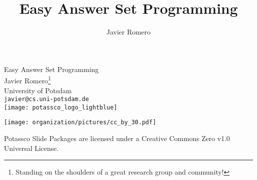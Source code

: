 \title{Easy Answer Set Programming}
\author{Javier Romero}
\begin{frame}[c]
  \bigskip
  \vfill
  \begin{center}%
    \alert{\huge Easy Answer Set Programming}
    \bigskip
    \bigskip
    \\
    Javier Romero\footnote{%
    Standing on the shoulders of a great research group and community!}\\
    University of Potsdam\\
    \texttt{javier@cs.uni-potsdam.de}\\
    \bigskip
    \texttt{[image: potassco\_logo\_lightblue]}
  \end{center}
  \bigskip
  \begin{center}
    \texttt{[image: organization/pictures/cc\_by\_30.pdf]} %
    \par
    {\tiny Potassco Slide Packages are licensed under a Creative Commons Zero v1.0 Universal License.}
  \end{center}
\end{frame}
%

